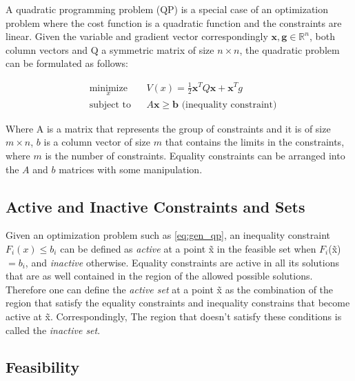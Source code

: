 A quadratic programming problem (QP) is a special case of an optimization problem where the cost function is a quadratic function and the constraints are linear. Given the variable  and gradient vector correspondingly $\mathbf{x}, \mathbf{g} \in \mathbb{R}^{n}$, both column vectors and Q a symmetric matrix of size $n \times n$, the quadratic problem can be formulated as follows: 

\begin{equation} \label{eq:quadproblem}
 \begin{aligned}
 & \underset{x}{\text{minimize}}
 & & V(x) = \frac{1}{2} \mathbf{x}^T Q \mathbf{x} + \mathbf{x}^T g \\
 & \text{subject to} 
 & & A\mathbf{x} \geq \mathbf b \mbox{  (inequality constraint)}
 \end{aligned}
\end{equation}

Where A is a matrix that represents the group of constraints and it is of size $m \times n$, $b$ is a column vector of size $m$ that contains the limits in the constraints, where $m$ is the number of constraints. Equality constraints can be arranged into the $A$ and $b$ matrices with some manipulation.

\subsection{Active and Inactive Constraints and Sets}%

Given an optimization problem such as \ref{eq:gen_qp}, an inequality constraint $F_{i}(x) \leq b_{i}$ can be defined as \emph{active} at a point \~{x} in the feasible set when $F_{i} $(\~{x})$ = b_{i}$, and \emph{inactive} otherwise. Equality constraints are active in all its solutions that are as well contained in the region of the allowed possible solutions.\\

Therefore one can define the \emph{active set} at a point \~{x} as the combination of the region that satisfy the equality constraints and inequality constrains that become active at \~{x}. Correspondingly, The region that doesn't satisfy these conditions is called the \emph{inactive set}.

\subsection{Feasibility}%

